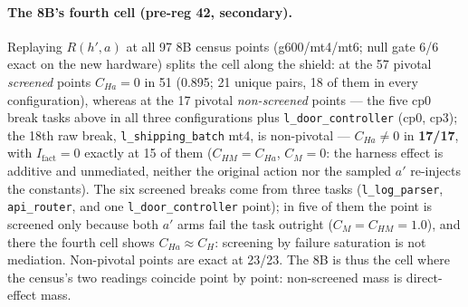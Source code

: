 \documentclass{article}
\theoremstyle{remark}
\begin{document}
\paragraph{The 8B's fourth cell (pre-reg 42, secondary).} Replaying
$R(h',a)$ at all 97 8B census points (g600/mt4/mt6; null gate 6/6 exact
on the new hardware) splits the cell along the shield: at the 57 pivotal
\emph{screened} points $C_{Ha} = 0$ in 51 (0.895; 21 unique pairs, 18 of
them in every configuration), whereas at the 17 pivotal
\emph{non-screened} points --- the five cp0 break tasks above in all
three configurations plus \texttt{l\_door\_controller} (cp0, cp3); the
18th raw break, \texttt{l\_shipping\_batch} mt4, is non-pivotal ---
$C_{Ha} \neq 0$ in \textbf{17/17}, with $I_{\text{fact}} = 0$ exactly at
15 of them
($C_{HM} = C_{Ha}$, $C_M = 0$: the harness effect is additive and
unmediated, neither the original action nor the sampled $a'$ re-injects
the constants). The six screened breaks come from three tasks
(\texttt{l\_log\_parser}, \texttt{api\_router}, and one
\texttt{l\_door\_controller} point); in five of them the point is
screened only because both $a'$ arms fail the task outright ($C_M = C_{HM}
= 1.0$), and there the fourth cell shows $C_{Ha} \approx C_H$: screening
by failure saturation is not mediation. Non-pivotal points are exact at
23/23. The 8B is thus the cell where the census's two readings coincide
point by point: non-screened mass is direct-effect mass.
\end{document}
